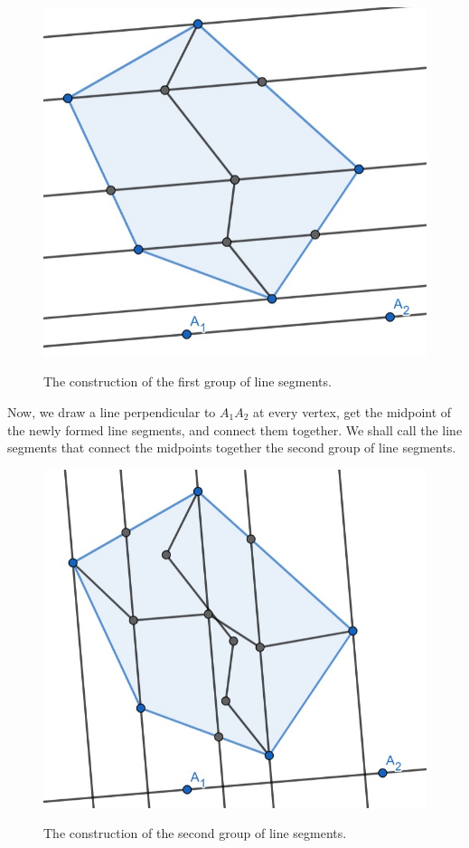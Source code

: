 \documentclass[12pt]{scrartcl}
\begin{document}
\begin{figure}[htpb]
	\centering
	\includegraphics[scale=.75]{images/rq3_1_2.jpg}
	\label{fig:rq3_1_2_img}
	\caption{The construction of the first group of line segments.}
\end{figure}

Now, we draw a line perpendicular to $A_{1}A_{2}$ at every vertex, get the midpoint of the newly formed line segments, and connect them together. We shall call the line segments that connect the midpoints together the second group of line segments.

\begin{figure}[htpb]
	\centering
	\includegraphics[scale=.75]{images/rq3_1_3.jpg}
	\label{fig:rq3_1_3_img}
	\caption{The construction of the second group of line segments.}
\end{figure}
\end{document}
